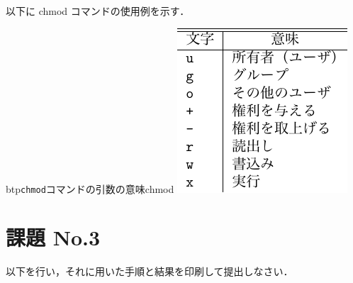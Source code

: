 以下に chmod コマンドの使用例を示す．

\begin{mytable}{btp}{\texttt{chmod}コマンドの引数の意味}{chmod}
  \includegraphics[scale=1.0]{Tbl/chmodOptions.pdf}
\end{mytable}



\newpage
\section*{課題 No.3}
以下を行い，それに用いた手順と結果を印刷して提出しなさい．

